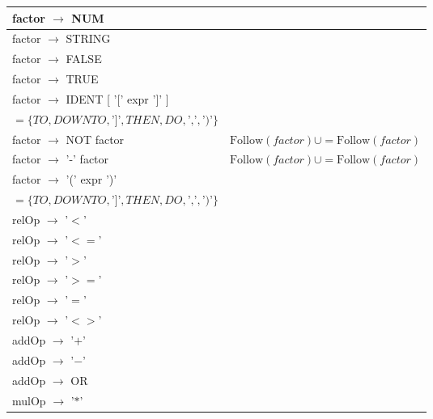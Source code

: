 \documentclass[8pt]{scrartcl}
\newcommand{\First}[1]{\mathrm{First}(#1)}
\newcommand{\Follow}[1]{\mathrm{Follow}(#1)}
\newcommand{\epsset}{\{\varepsilon\}}
\begin{document}
\begin{itemize}
\begin{tabular}{|l|l|}
                    \hline
                    factor $\rightarrow$ NUM &\\
                    \hline
                    factor $\rightarrow$ STRING &\\
                    \hline
                    factor $\rightarrow$ FALSE &\\
                    \hline
                    factor $\rightarrow$ TRUE &\\
                    \hline
                    factor $\rightarrow$ IDENT [ '[' expr ']' ] & \makecell[l]{$\Follow{expr} \cup = \First{\text{']'}} \setminus \epsset $\\$= \{TO, DOWNTO, \text{']'}, THEN, DO, \text{','}, \text{'$)$'}\}$} \\
                    \hline
                    factor $\rightarrow$ NOT factor & $\Follow{factor} \cup = \Follow{factor}$\\
                    \hline
                    factor $\rightarrow$ '-' factor & $\Follow{factor} \cup = \Follow{factor}$\\
                    \hline
                    factor $\rightarrow$ '(' expr ')' & \makecell[l]{$\Follow{expr} \cup = \First{\text{'$)$'}} \setminus \epsset $\\ $= \{TO, DOWNTO, \text{']'}, THEN, DO, \text{','}, \text{'$)$'}\}$}\\
                    \hline
                    relOp $\rightarrow$ '$<$' & \\
                    \hline
                    relOp $\rightarrow$ '$<=$' & \\
                    \hline
                    relOp $\rightarrow$ '$>$' & \\
                    \hline
                    relOp $\rightarrow$ '$>=$' & \\
                    \hline
                    relOp $\rightarrow$ '$=$' & \\
                    \hline
                    relOp $\rightarrow$ '$<>$' & \\
                    \hline
                    addOp $\rightarrow$ '$+$' & \\
                    \hline
                    addOp $\rightarrow$ '$-$' & \\
                    \hline
                    addOp $\rightarrow$ OR & \\
                    \hline
                    mulOp $\rightarrow$ '$*$' & \\

\end{tabular}
\end{itemize}
\end{document}
